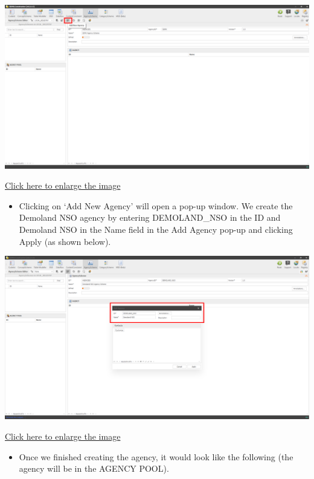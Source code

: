 \documentclass[
]{book}
\providecommand{\tightlist}{%
  \setlength{\itemsep}{0pt}\setlength{\parskip}{0pt}}
\theoremstyle{definition}
\theoremstyle{definition}
\theoremstyle{definition}
\theoremstyle{definition}
\theoremstyle{remark}
\begin{document}
\begin{center}\includegraphics[width=1\linewidth]{./images/image064} \end{center}

\href{images/image064.png}{Click here to enlarge the image}

\begin{itemize}
\tightlist
\item
  Clicking on `Add New Agency' will open a pop-up window. We create the Demoland NSO agency by entering DEMOLAND\_NSO in the ID and Demoland NSO in the Name field in the Add Agency pop-up and clicking Apply (as shown below).
\end{itemize}

\begin{center}\includegraphics[width=1\linewidth]{./images/image066} \end{center}

\href{images/image066.png}{Click here to enlarge the image}

\begin{itemize}
\tightlist
\item
  Once we finished creating the agency, it would look like the following (the agency will be in the AGENCY POOL).
\end{itemize}
\end{document}
